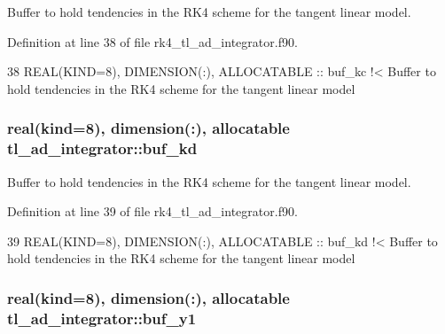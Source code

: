 Buffer to hold tendencies in the R\+K4 scheme for the tangent linear model. 



Definition at line 38 of file rk4\+\_\+tl\+\_\+ad\+\_\+integrator.\+f90.


\begin{DoxyCode}
38   \textcolor{keywordtype}{REAL(KIND=8)}, \textcolor{keywordtype}{DIMENSION(:)}, \textcolor{keywordtype}{ALLOCATABLE} :: buf\_kc\textcolor{comment}{ !< Buffer to hold tendencies in the RK4 scheme for the
       tangent linear model}
\end{DoxyCode}
\subsubsection[{\texorpdfstring{buf\+\_\+kd}{buf_kd}}]{\setlength{\rightskip}{0pt plus 5cm}real(kind=8), dimension(\+:), allocatable tl\+\_\+ad\+\_\+integrator\+::buf\+\_\+kd\hspace{0.3cm}{\ttfamily [private]}}\hypertarget{namespacetl__ad__integrator_a3b72ebc24a7e0eb44e22e6489ac81ed3}{}\label{namespacetl__ad__integrator_a3b72ebc24a7e0eb44e22e6489ac81ed3}


Buffer to hold tendencies in the R\+K4 scheme for the tangent linear model. 



Definition at line 39 of file rk4\+\_\+tl\+\_\+ad\+\_\+integrator.\+f90.


\begin{DoxyCode}
39   \textcolor{keywordtype}{REAL(KIND=8)}, \textcolor{keywordtype}{DIMENSION(:)}, \textcolor{keywordtype}{ALLOCATABLE} :: buf\_kd\textcolor{comment}{ !< Buffer to hold tendencies in the RK4 scheme for the
       tangent linear model}
\end{DoxyCode}
\subsubsection[{\texorpdfstring{buf\+\_\+y1}{buf_y1}}]{\setlength{\rightskip}{0pt plus 5cm}real(kind=8), dimension(\+:), allocatable tl\+\_\+ad\+\_\+integrator\+::buf\+\_\+y1\hspace{0.3cm}{\ttfamily [private]}}\hypertarget{namespacetl__ad__integrator_a54c26282330477995b554805fbacf236}{}\label{namespacetl__ad__integrator_a54c26282330477995b554805fbacf236}


